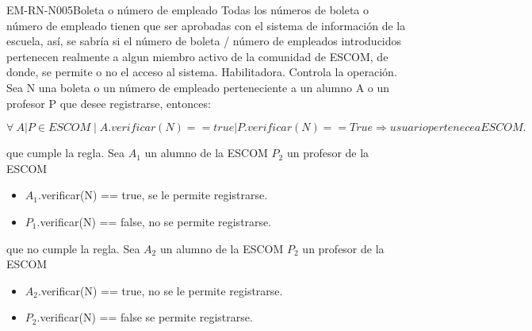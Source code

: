 \begin{BussinesRule}{EM-RN-N005}{Boleta o número de empleado}
	\BRitem[Descripción:]Todas los números de boleta o número de empleado tienen que ser aprobadas con el sistema de información de la escuela, así, se sabría si el número de boleta / número de empleados introducidos pertenecen realmente a algun miembro activo de la comunidad de ESCOM, de donde, se permite o no el acceso al sistema.
	\BRitem[Tipo:] Habilitadora.
	\BRitem[Nivel:] Controla la operación.
	\BRitem[Sentenia: ] Sea N una boleta o un número de empleado perteneciente a un alumno A o un profesor P que desee registrarse, entonces:
	\begin{center}
		$\forall \: A|P \in  ESCOM \mid A.verificar(N) == true | P.verificar(N) == True \Rightarrow usuario pertenece a ESCOM.$
	\end{center}
	
	 que cumple la regla.
		Sea $A_{1}$ un alumno de la ESCOM $P_{2}$ un profesor de la ESCOM
		\begin{itemize}
			\item $A_{1}$.verificar(N) == true, se le permite registrarse.
			\item $P_{1}$.verificar(N) == false, no se permite registrarse.
		\end{itemize}
	 que no cumple la regla.
		Sea $A_{2}$ un alumno de la ESCOM $P_{2}$ un profesor de la ESCOM
		\begin{itemize}
			\item $A_{2}$.verificar(N) == true, no se le permite registrarse.
			\item $P_{2}$.verificar(N) == false se permite registrarse.
		\end{itemize}
\end{BussinesRule}


